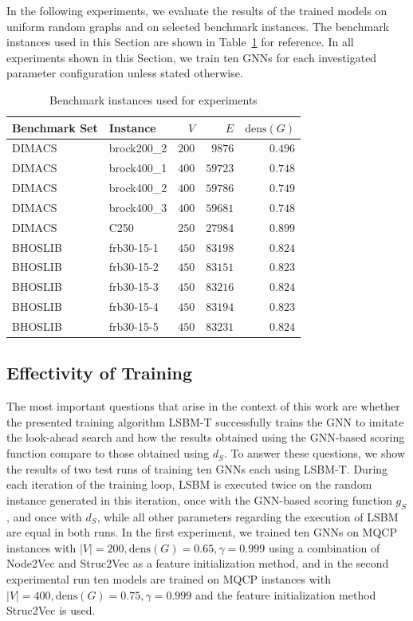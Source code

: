 \documentclass[draft,final]{vutinfth} %
\begin{document}
In the following experiments, we evaluate the results of the trained models on uniform random graphs and on selected benchmark instances. 
The benchmark instances used in this Section are shown in Table~\ref{tab:benchmark-instances-for-experiments} for reference. In all experiments shown in this Section, we train ten GNNs for each investigated parameter configuration unless stated otherwise. 

\begin{table}
    \centering
    \begin{tabular}{llrrr}
        Benchmark Set & Instance & $V$ & $E$ & $\mathrm{dens}(G)$  \\ \hline
        DIMACS & brock200\_2 & $200$ & $9876$ & $0.496$\\
        DIMACS & brock400\_1 & $400$ & $59723$ & $0.748$\\
        DIMACS & brock400\_2 & $400$ & $59786$ & $0.749$\\
        DIMACS & brock400\_3 & $400$ & $59681$ & $0.748$\\
        DIMACS & C250 & $250$ & $27984$ & $0.899$\\
        BHOSLIB & frb30-15-1 & $450$ & $83198$ & $0.824$\\
        BHOSLIB & frb30-15-2 & $450$ & $83151$ & $0.823$\\
        BHOSLIB & frb30-15-3 & $450$ & $83216$ & $0.824$\\
        BHOSLIB & frb30-15-4 & $450$ & $83194$ & $0.823$\\
        BHOSLIB & frb30-15-5 & $450$ & $83231$ & $0.824$\\
    \end{tabular}
    \caption{Benchmark instances used for experiments}
    \label{tab:benchmark-instances-for-experiments}
\end{table}

\subsection{Effectivity of Training}\label{sec:training-eval}
The most important questions that arise in the context of this work are whether the presented training algorithm LSBM-T successfully trains the GNN to imitate the look-ahead search and how the results obtained using the GNN-based scoring function compare to those obtained using $d_S$. 
To answer these questions, we show the results of two test runs of training ten GNNs each using LSBM-T. During each iteration of the training loop, LSBM is executed twice on the random instance generated in this iteration, once with the GNN-based scoring function $g_S$, and once with $d_S$, while all other parameters regarding the execution of LSBM are equal in both runs. 
In the first experiment, we trained ten GNNs on MQCP instances with $|V|=200, \mathrm{dens}(G)=0.65, \gamma=0.999$ using a combination of Node2Vec and Struc2Vec as a feature initialization method, and in the second experimental run ten models are trained on MQCP instances with $|V|=400, \mathrm{dens}(G)=0.75, \gamma=0.999$ and the feature initialization method Struc2Vec is used. 
\end{document}
